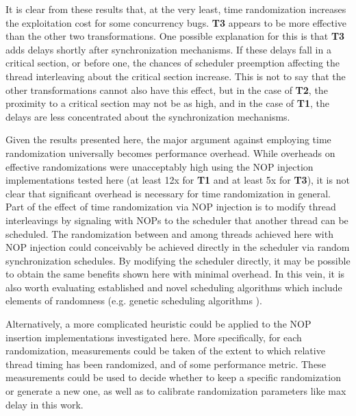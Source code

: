 It is clear from these results that, at the very least, time randomization increases the exploitation cost for some concurrency bugs.
\textbf{T3} appears to be more effective than the other two transformations.
One possible explanation for this is that \textbf{T3} adds delays shortly after synchronization mechanisms.
If these delays fall in a critical section, or before one, the chances of scheduler preemption affecting the thread interleaving about the critical section increase.
This is not to say that the other transformations cannot also have this effect, but in the case of \textbf{T2}, the proximity to a critical section may not be as high, and in the case of \textbf{T1}, the delays are less concentrated about the synchronization mechanisms.

Given the results presented here, the major argument against employing time randomization universally becomes performance overhead.
While overheads on effective randomizations were unacceptably high using the NOP injection implementations tested here (at least 12x for \textbf{T1} and at least 5x for \textbf{T3}), it is not clear that significant overhead is necessary for time randomization in general.
Part of the effect of time randomization via NOP injection is to modify thread interleavings by signaling with NOPs to the scheduler that another thread can be scheduled.
The randomization between and among threads achieved here with NOP injection could conceivably be achieved directly in the scheduler via random synchronization schedules.
By modifying the scheduler directly, it may be possible to obtain the same benefits shown here with minimal overhead.
In this vein, it is also worth evaluating established and novel scheduling algorithms which include elements of randomness (e.g. genetic scheduling algorithms \cite{Qiu2015}).

Alternatively, a more complicated heuristic could be applied to the NOP insertion implementations investigated here.
More specifically, for each randomization, measurements could be taken of the extent to which relative thread timing has been randomized, and of some performance metric.
These measurements could be used to decide whether to keep a specific randomization or generate a new one, as well as to calibrate randomization parameters like max delay in this work.